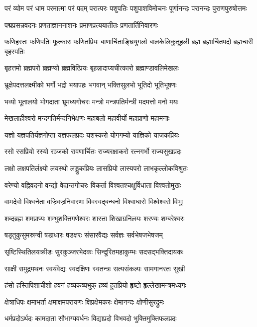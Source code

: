 \threelineshloka
{परं व्योम परं धाम परमात्मा परं पदम्}
{परात्परः पशुपतिः पशुपाशविमोचनः}
{पूर्णानन्दः परानन्दः पुराणपुरुषोत्तमः}

\twolineshloka
{पद्मप्रसन्नवदनः प्रणताज्ञाननाशनः}
{प्रमाणप्रत्ययातीतः प्रणतार्तिनिवारणः}

\threelineshloka
{फणिहस्तः फणिपतिः फूत्कारः फणितप्रियः}
{बाणार्चिताङ्घ्रियुगलो बालकेलिकुतूहली}
{ब्रह्म ब्रह्मार्चितपदो ब्रह्मचारी बृहस्पतिः}

\twolineshloka
{बृहत्तमो ब्रह्मपरो ब्रह्मण्यो ब्रह्मवित्प्रियः}
{बृहन्नादाग्र्यचीत्कारो ब्रह्माण्डावलिमेखलः}

\twolineshloka
{भ्रूक्षेपदत्तलक्ष्मीको भर्गो भद्रो भयापहः}
{भगवान् भक्तिसुलभो भूतिदो भूतिभूषणः}

\twolineshloka
{भव्यो भूतालयो भोगदाता भ्रूमध्यगोचरः}
{मन्त्रो मन्त्रपतिर्मन्त्री मदमत्तो मनो मयः}

\twolineshloka
{मेखलाहीश्वरो मन्दगतिर्मन्दनिभेक्षणः}
{महाबलो महावीर्यो महाप्राणो महामनाः}

\twolineshloka
{यज्ञो यज्ञपतिर्यज्ञगोप्ता यज्ञफलप्रदः}
{यशस्करो योगगम्यो याज्ञिको याजकप्रियः}

\twolineshloka
{रसो रसप्रियो रस्यो रञ्जको रावणार्चितः}
{राज्यरक्षाकरो रत्नगर्भो राज्यसुखप्रदः}

\twolineshloka
{लक्षो लक्षपतिर्लक्ष्यो लयस्थो लड्डुकप्रियः}
{लासप्रियो लास्यपरो लाभकृल्लोकविश्रुतः}

\twolineshloka
{वरेण्यो वह्निवदनो वन्द्यो वेदान्तगोचरः}
{विकर्ता विश्वतश्चक्षुर्विधाता विश्वतोमुखः}

\twolineshloka
{वामदेवो विश्वनेता वज्रिवज्रनिवारणः}
{विवस्वद्बन्धनो विश्वाधारो विश्वेश्वरो विभुः}

\twolineshloka
{शब्दब्रह्म शमप्राप्यः शम्भुशक्तिगणेश्वरः}
{शास्ता शिखाग्रनिलयः शरण्यः शम्बरेश्वरः}

\twolineshloka
{षडृतुकुसुमस्रग्वी षडाधारः षडक्षरः}
{संसारवैद्यः सर्वज्ञः सर्वभेषजभेषजम्}

\twolineshloka
{सृष्टिस्थितिलयक्रीडः सुरकुञ्जरभेदकः}
{सिन्दूरितमहाकुम्भः सदसद्भक्तिदायकः}

\twolineshloka
{साक्षी समुद्रमथनः स्वयंवेद्यः स्वदक्षिणः}
{स्वतन्त्रः सत्यसंकल्पः सामगानरतः सुखी}

\twolineshloka
{हंसो हस्तिपिशाचीशो हवनं हव्यकव्यभुक्}
{हव्यं हुतप्रियो हृष्टो हृल्लेखामन्त्रमध्यगः}

\twolineshloka
{क्षेत्राधिपः क्षमाभर्ता क्षमाक्षमपरायणः}
{क्षिप्रक्षेमकरः क्षेमानन्दः क्षोणीसुरद्रुमः}

\twolineshloka
{धर्मप्रदोऽर्थदः कामदाता सौभाग्यवर्धनः}
{विद्याप्रदो विभवदो भुक्तिमुक्तिफलप्रदः}

